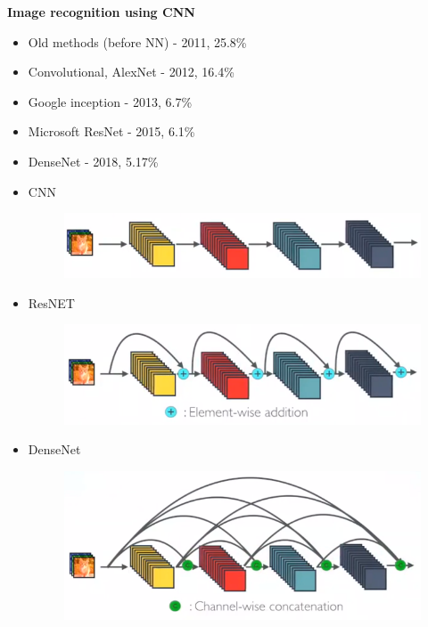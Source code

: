 \documentclass[xcolor=dvipsnames]{beamer}
\begin{document}
\begin{frame}{\bf Image recognition using CNN}

\begin{itemize}
  \item Old methods (before NN) - 2011, 25.8\%
  \item Convolutional, AlexNet - 2012, 16.4\%
  \item Google inception - 2013, 6.7\%
  \item Microsoft ResNet - 2015, 6.1\%
  \item DenseNet - 2018, 5.17\%
\end{itemize}

\begin{itemize}

    \item CNN
    \begin{figure}
      \includegraphics[scale=0.15]{../../diagrams/dnn_conv.png}
    \end{figure}

    \item ResNET
    \begin{figure}
      \includegraphics[scale=0.15]{../../diagrams/dnn_resnet.png}
    \end{figure}

    \item DenseNet
    \begin{figure}
      \includegraphics[scale=0.15]{../../diagrams/dnn_densenet.png}
    \end{figure}

\end{itemize}

\end{frame}
\end{document}
